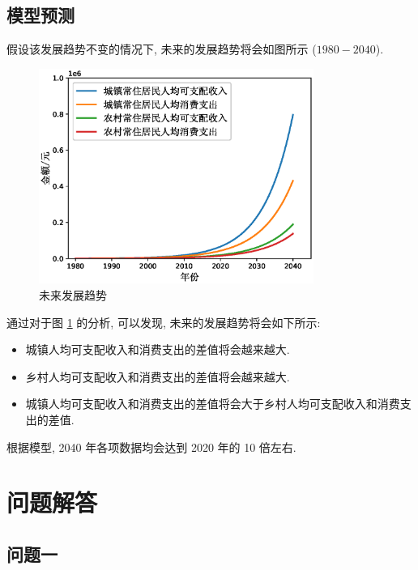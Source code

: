\documentclass{article}
\begin{document}
\subsection{模型预测}

\par 假设该发展趋势不变的情况下, 未来的发展趋势将会如图所示 ($1980-2040$).

\begin{figure}[H]
  \centering
  \includegraphics[width=0.8\textwidth]{figures/result1.eps}
  \caption{未来发展趋势}
  \label{fig:side:d}
\end{figure}

\par 通过对于图 \ref{fig:side:d} 的分析, 可以发现, 未来的发展趋势将会如下所示:
\begin{itemize}
  \item 城镇人均可支配收入和消费支出的差值将会越来越大.
  \item 乡村人均可支配收入和消费支出的差值将会越来越大.
  \item 城镇人均可支配收入和消费支出的差值将会大于乡村人均可支配收入和消费支出的差值.
\end{itemize}

\par 根据模型, 2040 年各项数据均会达到 2020 年的 10 倍左右.\\

\section{问题解答}

\subsection{问题一}
\end{document}

